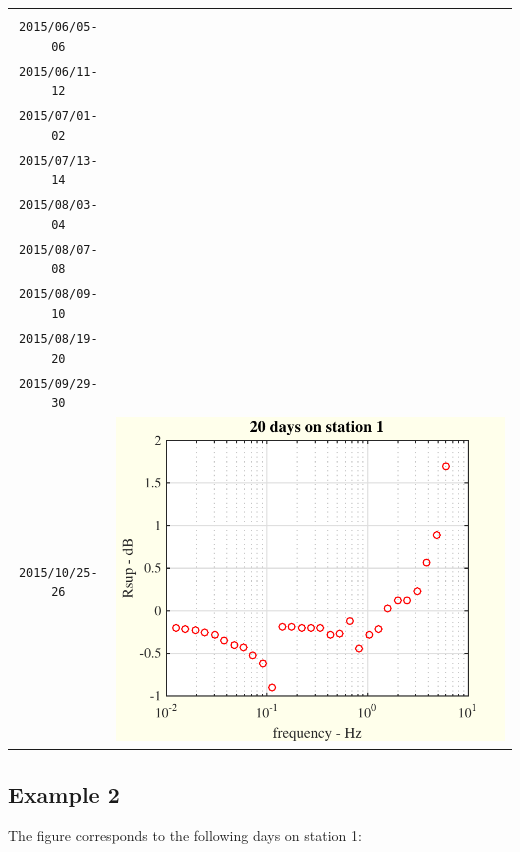 \documentclass[a4paper, 12pt]{report}
\begin{document}
\begin{tabular}{cc}
 \begin{minipage}{0.35\textwidth}
 days:\\
 {\tt   2015/06/05-06}\\
 {\tt   2015/06/11-12}  \\
 {\tt   2015/07/01-02}  \\
 {\tt   2015/07/13-14}  \\
 {\tt   2015/08/03-04}  \\
 {\tt   2015/08/07-08}  \\
 {\tt   2015/08/09-10}  \\
 {\tt   2015/08/19-20}  \\
 {\tt   2015/09/29-30}  \\
 {\tt   2015/10/25-26}  
\end{minipage}
&
 \begin{minipage}{0.35\textwidth}
\includegraphics[scale=0.8]{example1onstation1.pdf}
\end{minipage}
\end{tabular}
 
 
\subsection{Example 2}
 The figure corresponds to the following days on station 1:
\end{document}
